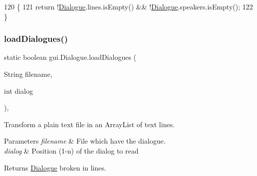 \begin{DoxyCode}
120                                               \{
121         \textcolor{keywordflow}{return} !\mbox{\hyperlink{classgui_1_1_dialogue_afcba0958e7749ae95706d5f1d81800cd}{Dialogue}}.lines.isEmpty() && !\mbox{\hyperlink{classgui_1_1_dialogue_afcba0958e7749ae95706d5f1d81800cd}{Dialogue}}.speakers.isEmpty();
122     \}
\end{DoxyCode}
\mbox{\label{classgui_1_1_dialogue_a05d9e1fa1c276d33a40b5321d2e6d594}} 
\subsubsection{\texorpdfstring{load\+Dialogues()}{loadDialogues()}}
{\footnotesize\ttfamily static boolean gui.\+Dialogue.\+load\+Dialogues (\begin{DoxyParamCaption}\item[{String}]{filename,  }\item[{int}]{dialog }\end{DoxyParamCaption})\hspace{0.3cm}{\ttfamily [inline]}, {\ttfamily [static]}}

Transform a plain text file in an Array\+List of text lines.


\begin{DoxyParams}{Parameters}
{\em filename} & File which have the dialogue. \\
\hline
{\em dialog} & Position (1-\/n) of the dialog to read \\
\hline
\end{DoxyParams}
\begin{DoxyReturn}{Returns}
\mbox{\hyperlink{classgui_1_1_dialogue}{Dialogue}} broken in lines. 
\end{DoxyReturn}

